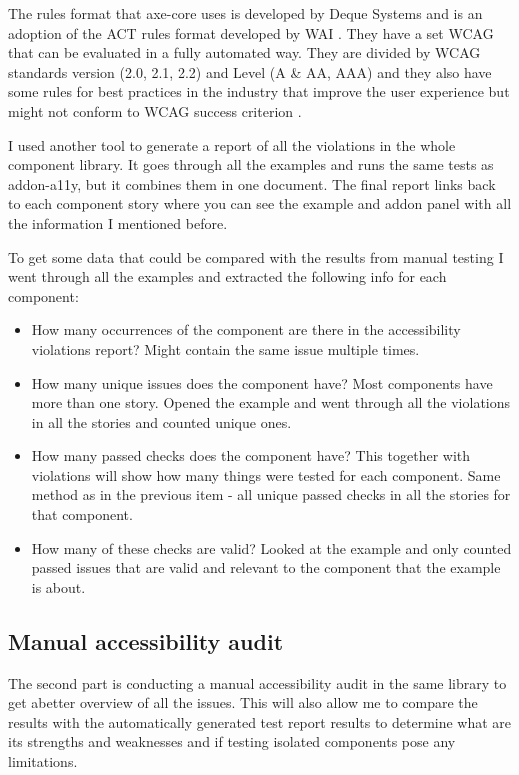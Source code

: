 \documentclass{master_thesis}
\begin{document}
The rules format that axe-core uses is developed by Deque Systems and is an adoption of the ACT rules format developed by WAI \citep{Fiers2017}. They have a set WCAG that can be evaluated in a fully automated way. They are divided by WCAG standards version (2.0, 2.1, 2.2) and Level (A \& AA, AAA) and they also have some rules for best practices in the industry that improve the user experience but might not conform to WCAG success criterion \citep{Fiers2023}.

I used another tool to generate a report of all the violations in the whole component library. It goes through all the examples and runs the same tests as addon-a11y, but it combines them in one document. The final report links back to each component story where you can see the example and addon panel with all the information I mentioned before.

To get some data that could be compared with the results from manual testing I went through all the examples and extracted the following info for each component:

\begin{itemize}
	\item How many occurrences of the component are there in the accessibility violations report?  Might contain the same issue multiple times.
	\item How many unique issues does the component have? Most components have more than one story. Opened the example and went through all the violations in all the stories and counted unique ones.
	\item How many passed checks does the component have? This together with violations will show how many things were tested for each component. Same method as in the previous item - all unique passed checks in all the stories for that component.
	\item How many of these checks are valid? Looked at the example and only counted passed issues that are valid and relevant to the component that the example is about.
\end{itemize}

\subsection{Manual accessibility audit}

The second part is conducting a manual accessibility audit in the same library to get abetter overview of all the issues. This will also allow me to compare the results with the automatically generated test report results to determine what are its strengths and weaknesses and if testing isolated components pose any limitations.
\end{document}
